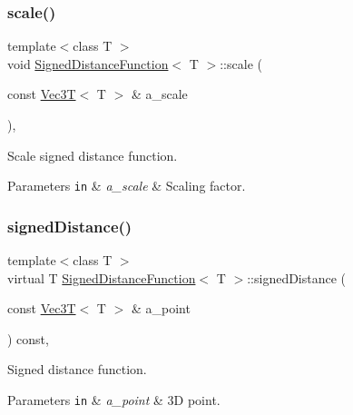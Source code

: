 \subsubsection{\texorpdfstring{scale()}{scale()}}
{\footnotesize\ttfamily template$<$class T $>$ \\
void \hyperlink{classSignedDistanceFunction}{Signed\+Distance\+Function}$<$ T $>$\+::scale (\begin{DoxyParamCaption}\item[{const \hyperlink{classVec3T}{Vec3T}$<$ T $>$ \&}]{a\+\_\+scale }\end{DoxyParamCaption})\hspace{0.3cm}{\ttfamily [inline]}, {\ttfamily [noexcept]}}



Scale signed distance function. 


\begin{DoxyParams}[1]{Parameters}
\mbox{\tt in}  & {\em a\+\_\+scale} & Scaling factor. \\
\hline
\end{DoxyParams}
\mbox{\label{classSignedDistanceFunction_af5912280ca51dc21a2d6949a30ec7d21}} 
\subsubsection{\texorpdfstring{signed\+Distance()}{signedDistance()}}
{\footnotesize\ttfamily template$<$class T $>$ \\
virtual T \hyperlink{classSignedDistanceFunction}{Signed\+Distance\+Function}$<$ T $>$\+::signed\+Distance (\begin{DoxyParamCaption}\item[{const \hyperlink{classVec3T}{Vec3T}$<$ T $>$ \&}]{a\+\_\+point }\end{DoxyParamCaption}) const\hspace{0.3cm}{\ttfamily [pure virtual]}, {\ttfamily [noexcept]}}



Signed distance function. 


\begin{DoxyParams}[1]{Parameters}
\mbox{\tt in}  & {\em a\+\_\+point} & 3D point. \\
\hline
\end{DoxyParams}


